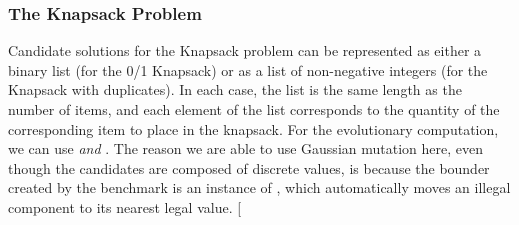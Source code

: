 \documentclass[letterpaper,10pt,english]{sphinxmanual}
\begin{document}
\subsubsection{The Knapsack Problem}
\label{examples:the-knapsack-problem}
Candidate solutions for the Knapsack problem can be represented as either a binary
list (for the 0/1 Knapsack) or as a list of non-negative integers (for the Knapsack
with duplicates). In each case, the list is the same length as the number of items,
and each element of the list corresponds to the quantity of the corresponding item
to place in the knapsack. For the evolutionary computation, we can use
 \emph{and} . The reason we are able to use
Gaussian mutation here, even though the candidates are composed of discrete values,
is because the bounder created by the  benchmark is an instance of
, which automatically moves an illegal component to its nearest
legal value.
{[}\code{download}{]}
\end{document}
